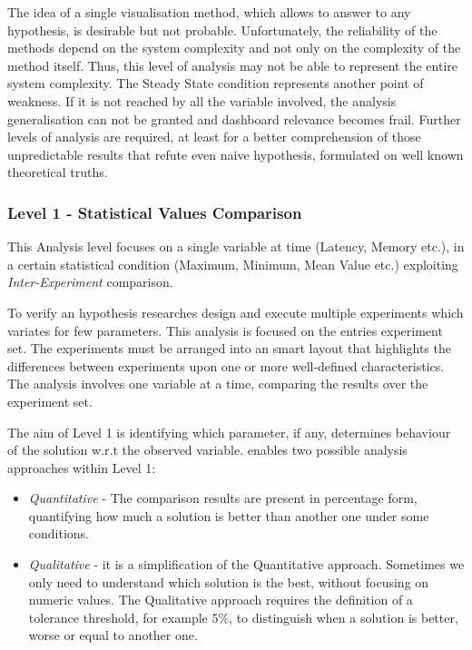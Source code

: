 The idea of a single visualisation method, which allows to answer to any hypothesis, is desirable but not probable.  Unfortunately, the reliability of the methods depend on the system complexity and not only on the complexity of the method itself. Thus, this level of analysis may not be able to represent the entire system complexity. The Steady State condition represents another point of weakness. If it is not reached by all the variable involved, the analysis generalisation can not be granted and dashboard relevance becomes frail. Further levels of analysis are required, at least for a better comprehension of those unpredictable results that refute even naive hypothesis, formulated on well known theoretical truths.


\subsubsection{Level 1 -  Statistical Values Comparison}\label{sec:heaven-level1}

This Analysis level focuses on a single variable at time (Latency, Memory etc.), in a certain statistical condition (Maximum, Minimum, Mean Value etc.) exploiting \textit{Inter-Experiment} comparison. 

To verify an hypothesis researches design and execute multiple experiments which variates for few parameters. This analysis is focused on the entries experiment set. The experiments must be arranged into an smart layout that highlights the differences between experiments upon one or more well-defined characteristics. The analysis involves one variable at a time, comparing the results over the experiment set. 

The aim of Level 1 is identifying which parameter, if any, determines behaviour of the solution w.r.t the observed variable. \name enables two possible analysis approaches within Level 1:
\begin{itemize}
\item \textit{Quantitative} -  The comparison results are present in percentage form, quantifying how much a solution is better than another one under some conditions. 
\item \textit{Qualitative} - it is a simplification of the Quantitative approach. Sometimes we only need to understand which solution is the best, without focusing on numeric values. The Qualitative approach requires the definition of a tolerance threshold, for example 5\%, to distinguish when a solution is better, worse or equal to another one.
\end{itemize}

